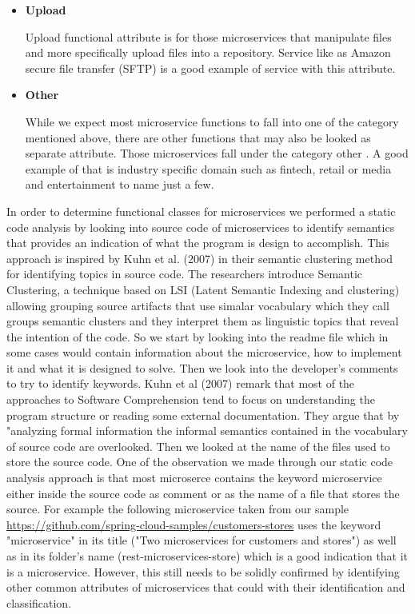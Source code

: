 \documentclass{article}
\begin{document}
\begin{itemize}
\item \textbf{Upload}

Upload functional attribute is for those microservices that manipulate files and more specifically upload files into a repository. Service like as Amazon secure file transfer (SFTP) is a good example of service with this attribute.

\item \textbf{Other}

While we expect most microservice functions to fall into one of the category mentioned above, there are other functions that may also be looked as separate attribute. Those microservices fall under the category other . A good example of that is industry specific domain such as fintech, retail or media and entertainment to name just a few.

\end{itemize}
In order to determine functional classes for microservices we performed a static code analysis by looking into source code of microservices to identify semantics that provides an indication of what the program is design to accomplish. This approach is inspired by Kuhn et al. (2007) in their semantic clustering method for identifying topics in source code. The researchers introduce Semantic Clustering, a technique based on LSI (Latent Semantic Indexing and clustering) allowing grouping source artifacts that use simalar vocabulary which they call groups semantic clusters and they interpret them as linguistic topics that reveal the intention of the code. So we start by looking into the readme file which in some cases would contain information about the microservice, how to implement it and what it is designed to solve. Then we look into the developer's comments to try to identify keywords. Kuhn et al (2007) remark that most of the approaches to Software Comprehension tend to focus on understanding the program structure or reading some external documentation. They argue that by "analyzing formal information the informal semantics contained in the vocabulary of source code are overlooked. Then we looked at the name of the files used to store the source code. One of the observation we made through our static code analysis approach is that most microserce contains the keyword microservice either inside the source code as comment or as the name of a file that stores the source. For example the following microservice taken from our sample \url{https://github.com/spring-cloud-samples/customers-stores} uses the keyword "microservice" in its title ("Two microservices for customers and stores") as well as in its folder's name (rest-microservices-store) which is a good indication that it is a microservice. However, this still needs to be solidly confirmed by identifying other common attributes of microservices that could with their identification and classification.
\end{document}
